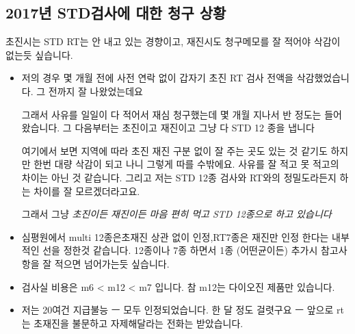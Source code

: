 \subsection{2017년 STD검사에 대한 청구 상황}
초진시는 STD RT는 안 내고 있는 경향이고, 재진시도 청구메모를 잘 적어야 삭감이 없는듯 싶습니다.
\begin{itemize}\tightlist
\item 저의 경우 몇 개월 전에 사전 연락 없이 갑자기 초진 RT 검사 전액을 삭감했었습니다. 그 전까지 잘 나왔었는데요 \par
그래서 사유를 일일이 다 적어서 재심 청구했는데 몇 개월 지나서 반 정도는 들어왔습니다. 그 다음부터는 초진이고 재진이고 그냥 다 STD 12 종을 냅니다\par
여기에서 보면 지역에 따라 초진 재진 구분 없이 잘 주는 곳도 있는 것 같기도 하지만 한번 대량 삭감이 되고 나니 그렇게 따를 수밖에요. 사유를 잘 적고 못 적고의 차이는 아닌 것 같습니다. 그리고 저는 STD 12종 검사와  RT와의 정밀도라든지 하는 차이를 잘 모르겠더라고요.\par
그래서 그냥 \emph{초진이든 재진이든 마음 편히 먹고 STD 12종으로 하고 있습니다}
\item 심평원에서 multi 12종은초재진 상관 없이 인정,RT7종은 재진만 인정 한다는 내부적인 선을 정한것 같습니다. 12종이나 7종 하면서 1종 (어떤균이든) 추가시 참고사항을 잘 적으면 넘어가는듯 싶습니다.
\item 검사실 비용은 m6 < m12 < m7 입니다. 참 m12는 다이오진 제품만 있습니다.
\item 저는 20여건 지급불능 ㅡ 모두 인정되었습니다. 한 달 정도 걸렷구요 ㅡ 앞으로 rt 는 초재진을 불문하고 자제해달라는 전화는 받았습니다.
\end{itemize}
